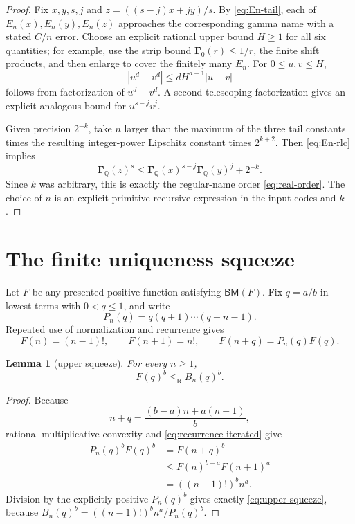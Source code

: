 \documentclass[11pt]{article}
\newtheorem{lemma}[theorem]{Lemma}
\newcommand{\Q}{\mathbb Q}
\newcommand{\Gam}{\boldsymbol\Gamma}
\newcommand{\Le}{\mathrel{\le_{\!\mathsf R}}}
\newcommand{\BM}{\mathsf{BM}}
\newcommand{\abs}[1]{\left|#1\right|}
\begin{document}
\begin{proof}
Fix $x,y,s,j$ and $z=((s-j)x+jy)/s$.  By \eqref{eq:En-tail}, each of
$E_n(x),E_n(y),E_n(z)$ approaches the corresponding gamma name with a stated
$C/n$ error.  Choose an explicit rational upper bound $H\ge1$ for all six
quantities; for example, use the strip bound $\Gam_0(r)\le1/r$, the finite
shift products, and then enlarge to cover the finitely many $E_n$.
For $0\le u,v\le H$,
\begin{equation}
 \abs{u^d-v^d}\le dH^{d-1}\abs{u-v}
 \label{eq:power-lipschitz}
\end{equation}
follows from factorization of $u^d-v^d$.  A second telescoping factorization
gives an explicit analogous bound for $u^{s-j}v^j$.

Given precision $2^{-k}$, take $n$ larger than the maximum of the three tail
constants times the resulting integer-power Lipschitz constant times
$2^{k+2}$.  Then \eqref{eq:En-rlc} implies
\[
 \Gam_{\Q}(z)^s
 \le \Gam_{\Q}(x)^{s-j}\Gam_{\Q}(y)^j+2^{-k}.
\]
Since $k$ was arbitrary, this is exactly the regular-name order
\eqref{eq:real-order}.  The choice of $n$ is an explicit primitive-recursive
expression in the input codes and $k$.
\end{proof}

\section{The finite uniqueness squeeze}
\label{sec:uniqueness}

Let $F$ be any presented positive function satisfying $\BM(F)$.  Fix
$q=a/b$ in lowest terms with $0<q\le1$, and write
\[
 P_n(q)=q(q+1)\cdots(q+n-1).
\]
Repeated use of normalization and recurrence gives
\begin{equation}
 F(n)=(n-1)!,\qquad F(n+1)=n!,\qquad
 F(n+q)=P_n(q)F(q).
 \label{eq:recurrence-iterated}
\end{equation}

\begin{lemma}[upper squeeze]
For every $n\ge1$,
\begin{equation}
 F(q)^b\Le B_n(q)^b.
 \label{eq:upper-squeeze}
\end{equation}
\end{lemma}

\begin{proof}
Because
\[
 n+q=\frac{(b-a)n+a(n+1)}b,
\]
rational multiplicative convexity and \eqref{eq:recurrence-iterated} give
\begin{align*}
 P_n(q)^bF(q)^b
 &=F(n+q)^b\\
 &\le F(n)^{b-a}F(n+1)^a\\
 &=((n-1)!)^b n^a.
\end{align*}
Division by the explicitly positive $P_n(q)^b$ gives exactly
\eqref{eq:upper-squeeze}, because
$B_n(q)^b=((n-1)!)^b n^a/P_n(q)^b$.
\end{proof}
\end{document}

